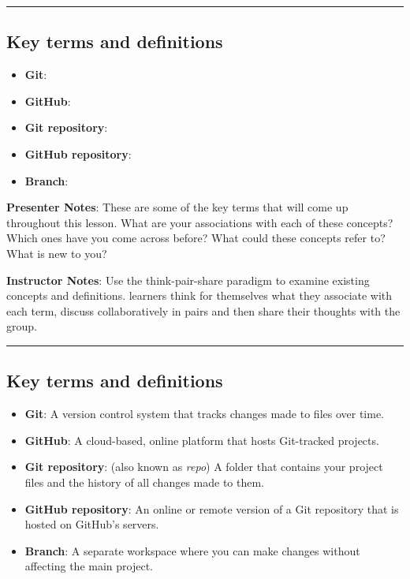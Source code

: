 \documentclass[
  letterpaper,
  DIV=11,
  numbers=noendperiod]{scrartcl}
\providecommand{\tightlist}{%
  \setlength{\itemsep}{0pt}\setlength{\parskip}{0pt}}
\begin{document}
\begin{center}\rule{0.5\linewidth}{0.5pt}\end{center}

\subsection{Key terms and definitions}\label{key-terms-and-definitions}

\begin{itemize}
\tightlist
\item
  \textbf{Git}:\\
\item
  \textbf{GitHub}:
\item
  \textbf{Git repository}:
\item
  \textbf{GitHub repository}:
\item
  \textbf{Branch}:
\end{itemize}

\textbf{Presenter Notes}: These are some of the key terms that will come
up throughout this lesson. What are your associations with each of these
concepts? Which ones have you come across before? What could these
concepts refer to? What is new to you?

\textbf{Instructor Notes}: Use the think-pair-share paradigm to examine
existing concepts and definitions. learners think for themselves what
they associate with each term, discuss collaboratively in pairs and then
share their thoughts with the group.

\begin{center}\rule{0.5\linewidth}{0.5pt}\end{center}

\subsection{Key terms and
definitions}\label{key-terms-and-definitions-1}

\begin{itemize}
\tightlist
\item
  \textbf{Git}: A version control system that tracks changes made to
  files over time.\\
\item
  \textbf{GitHub}: A cloud-based, online platform that hosts Git-tracked
  projects.
\item
  \textbf{Git repository}: (also known as \emph{repo}) A folder that
  contains your project files and the history of all changes made to
  them.
\item
  \textbf{GitHub repository}: An online or remote version of a Git
  repository that is hosted on GitHub's servers.
\item
  \textbf{Branch}: A separate workspace where you can make changes
  without affecting the main project.
\end{itemize}
\end{document}
